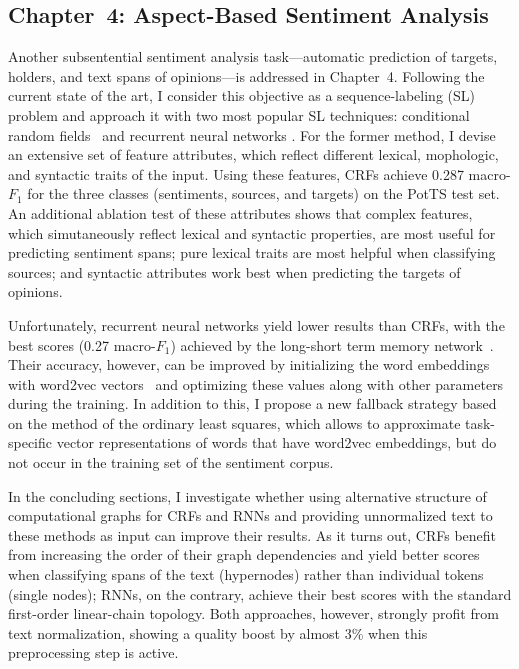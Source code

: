 \documentclass[11pt]{article}
\newcommand{\F}[0]{$F_1$}
\renewcommand{\cite}{\citep}
\begin{document}
\subsection{Chapter~4: Aspect-Based Sentiment Analysis}

Another subsentential sentiment analysis task---automatic prediction
of targets, holders, and text spans of opinions---is addressed in
Chapter~4.  Following the current state of the art, I consider this
objective as a sequence-labeling (SL) problem and approach it with two
most popular SL techniques: conditional random fields~\cite[CRFs;
][]{Lafferty:01} and recurrent neural networks \cite[RNNs;
][]{Hochreiter:97,Cho:14a}.  For the former method, I devise an
extensive set of feature attributes, which reflect different lexical,
mophologic, and syntactic traits of the input.  Using these features,
CRFs achieve 0.287 macro-\F{} for the three classes (sentiments,
sources, and targets) on the PotTS test set.  An additional ablation
test of these attributes shows that complex features, which
simutaneously reflect lexical and syntactic properties, are most
useful for predicting sentiment spans; pure lexical traits are most
helpful when classifying sources; and syntactic attributes work best
when predicting the targets of opinions.

Unfortunately, recurrent neural networks yield lower results than
CRFs, with the best scores (0.27 macro-\F{}) achieved by the
long-short term memory network~\cite[LSTM; ][]{Hochreiter:97}.  Their
accuracy, however, can be improved by initializing the word embeddings
with word2vec vectors~\cite{Mikolov:13} and optimizing these values
along with other parameters during the training.  In addition to this,
I propose a new fallback strategy based on the method of the ordinary
least squares, which allows to approximate task-specific vector
representations of words that have word2vec embeddings, but do not
occur in the training set of the sentiment corpus.

In the concluding sections, I investigate whether using alternative
structure of computational graphs for CRFs and RNNs and providing
unnormalized text to these methods as input can improve their results.
As it turns out, CRFs benefit from increasing the order of their graph
dependencies and yield better scores when classifying spans of the
text (hypernodes) rather than individual tokens (single nodes); RNNs,
on the contrary, achieve their best scores with the standard
first-order linear-chain topology.  Both approaches, however, strongly
profit from text normalization, showing a quality boost by almost 3\%
when this preprocessing step is active.
\end{document}
